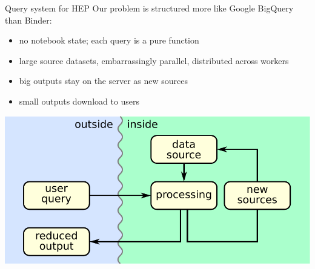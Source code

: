 \documentclass[aspectratio=169]{beamer}
\begin{document}
\begin{frame}{Query system for HEP}
\vspace{0.35 cm}
Our problem is structured more like Google BigQuery than Binder:

\vspace{0.15 cm}
\begin{itemize}
\item no notebook state; each query is a pure function
\item large source datasets, embarrassingly parallel, distributed across workers
\item big outputs stay on the server as new sources
\item small outputs download to users
\end{itemize}

\vspace{0.15 cm}
\begin{center}
\includegraphics[width=0.6\linewidth]{basic-block-diagram.pdf}
\end{center}
\end{frame}
\end{document}
